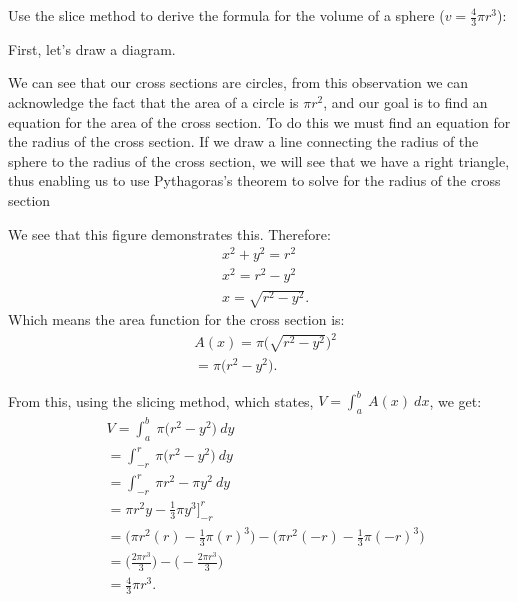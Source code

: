 \documentclass{report}
\begin{document}
    \pagebreak \bigbreak \noindent 
    \begin{eg}
        Use the slice method to derive the formula for the volume of a sphere ($v=\frac{4}{3}\pi r^{3}$):    
    \end{eg}
    \bigbreak \noindent 
    First, let's draw a diagram.
    \bigbreak \noindent 
    \begin{minipage}[]{0.47\textwidth}
    \end{minipage}
    \begin{minipage}[]{0.47\textwidth}
        We can see that our cross sections are circles, from this observation we can acknowledge the fact that the area of a circle is $\pi r^{2}$, and our goal is to find an equation for the area of the cross section. To do this we must find an equation for the radius of the cross section. If we draw a line connecting the radius of the sphere to the radius of the cross section, we will see that we have a right triangle, thus enabling us to use Pythagoras's theorem to solve for the radius of the cross section
    \end{minipage}
    \bigbreak \noindent 
    \begin{minipage}[]{0.47\textwidth}
    \end{minipage}
    \begin{minipage}[]{0.47\textwidth}
        We see that this figure demonstrates this. Therefore:
        \begin{align*}
            &x^{2} + y^{2} = r^{2} \\
            &x^{2} = r^{2} - y^{2} \\
            &x = \sqrt{r^{2}-y^{2}}
        .\end{align*}
        \bigbreak \noindent 
        Which means the area function for the cross section  is:
        \begin{align*}
            &A(x) =\pi \bigg(\sqrt{r^{2}-y^{2}}\bigg)^{2} \\
            &= \pi \bigg(r^{2}-y^{2}\bigg)
        .\end{align*}
    \end{minipage}
    \bigbreak \noindent 
    From this, using the slicing method, which states, $V = \int_{a}^{b}\ A(x)\ dx $, we get:
    \begin{align*}
        &V= \int_{a}^{b}\ \pi \bigg(r^{2}-y^{2}\bigg)\ dy \\
        &= \int_{-r}^{r}\ \pi \bigg(r^{2}-y^{2}\bigg)\ dy \\
        &= \int_{-r}^{r}\ \pi r^{2} - \pi y^{2}\ dy \\
        &= \pi r^{2}y - \frac{1}{3}\pi y^{3}\bigg]^{r}_{-r} \\
        &= \bigg(\pi r^{2}(r)-\frac{1}{3}\pi(r)^{3}\bigg) - \bigg(\pi r^{2}(-r)-\frac{1}{3}\pi(-r)^{3}\bigg) \\
        &= \bigg(\frac{2\pi r^{3}}{3}\bigg) - \bigg(- \frac{2\pi r^{3}}{3}\bigg) \\
        &= \frac{4}{3}\pi r^{3}
    .\end{align*}
    
\end{document}
